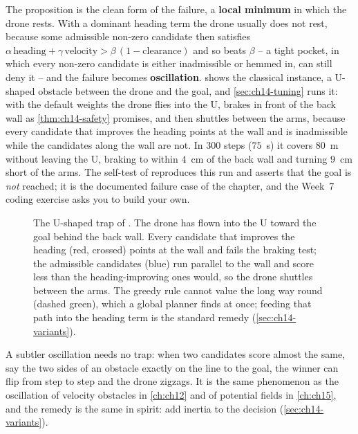 The proposition is the clean form of the failure, a
\textbf{local minimum} in which
the drone rests. With a dominant heading term the drone usually does not rest, because some
admissible non-zero candidate then satisfies $\alpha\,\mathrm{heading} +
\gamma\,\mathrm{velocity} > \beta\,(1 - \mathrm{clearance})$ and so beats
$\beta$ -- a tight pocket, in which every non-zero candidate is either
inadmissible or hemmed in, can still deny it -- and the failure becomes
\textbf{oscillation}.
 shows the classical instance, a U-shaped obstacle
between the drone and the goal, and \cref{sec:ch14-tuning} runs it: with the
default weights the drone flies into the U, brakes in front of the back wall
as \cref{thm:ch14-safety} promises, and then shuttles between the arms,
because every candidate that improves the heading points at the wall and is
inadmissible while the candidates along the wall are not. In $300$ steps
($75$~s) it covers $80$~m without leaving the U, braking to within $4$~cm of
the back wall and turning $9$~cm short of the arms. The self-test of
 reproduces this run and asserts
that the goal is \emph{not} reached; it is the documented failure case of the
chapter, and the Week~7 coding exercise asks you to build your own.

\begin{figure}[tb]
  \centering
  \caption{The U-shaped trap of . The drone has flown
  into the U toward the goal behind the back wall. Every candidate that
  improves the heading (red, crossed) points at the wall and fails the
  braking test; the admissible candidates (blue) run parallel to the wall
  and score less than the heading-improving ones would, so the drone shuttles
  between the arms. The greedy rule cannot value the long way round (dashed
  green), which a global planner finds at once; feeding that path into the
  heading term is the standard remedy (\cref{sec:ch14-variants}).}
  \label{fig:ch14-utrap}
\end{figure}

A subtler oscillation needs no trap: when two candidates score almost the
same, say the two sides of an obstacle exactly on the line to the goal, the
winner can flip from step to step and the drone zigzags. It is the same
phenomenon as the oscillation of velocity obstacles in \cref{ch:ch12} and of
potential fields in \cref{ch:ch15}, and the remedy is the same in spirit: add
inertia to the decision (\cref{sec:ch14-variants}).

